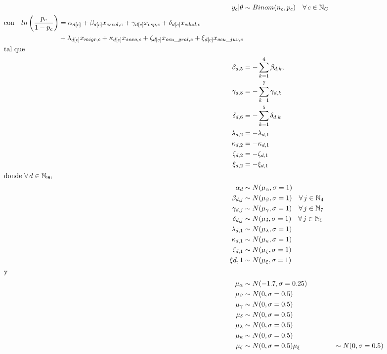 \begin{align}\label{eq:Modelo_Comp_G}
y_c|\theta & \sim Binom(n_c,p_c) \quad \forall \, c \in \mathbb{N}_C \nonumber \\
\begin{split}
\text{con} \quad ln\left(\dfrac{p_c}{1-p_c}\right) &= \alpha_{d[c]} + \beta_{d[c]} x_{escol,c} + \gamma_{d[c]} x_{csp,c} + \delta_{d[c]} x_{edad,c} \\
&+ \lambda_{d[c]} x_{migr,c} + \kappa_{d[c]} x_{sexo,c} + \zeta_{d[c]} x_{ocu\_gral,c} + \xi_{d[c]} x_{ocu\_juv,c} 
\end{split}\\
\intertext{tal que} 
\beta_{d,5} &= -\sum\limits_{k = 1}^{4} \beta_{d,k}, \nonumber \\
\gamma_{d,8} &= -\sum\limits_{k = 1}^{7} \gamma_{d,k} \nonumber \\
\delta_{d,6} &= -\sum\limits_{k = 1}^{5} \delta_{d,k} \nonumber \\
\lambda_{d,2} &= -\lambda_{d,1} \nonumber \\
\kappa_{d,2} &= -\kappa_{d,1} \nonumber \\
\zeta_{d,2} &= -\zeta_{d,1} \nonumber \\
\xi_{d,2} &= -\xi_{d,1} \nonumber \\
\intertext{donde $\forall \, d \in \mathbb{N}_{96}$}
\alpha_d &\sim N(\mu_{\alpha}, \sigma=1) \quad  \nonumber \\
\beta_{d,j} &\sim N(\mu_{\beta}, \sigma=1) \quad \forall \, j \in \mathbb{N}_{4} \nonumber \\
\gamma_{d,j} &\sim N(\mu_{\gamma}, \sigma=1) \quad \forall \, j \in \mathbb{N}_{7} \nonumber \\
\delta_{d,j} &\sim N(\mu_{\delta}, \sigma=1) \quad \forall \, j \in \mathbb{N}_{5}  \nonumber \\ 
\lambda_{d,1} &\sim N(\mu_{\lambda}, \sigma=1) \nonumber \\
\kappa_{d,1} &\sim N(\mu_{\kappa}, \sigma=1) \nonumber \\ 
\zeta_{d,1} &\sim N(\mu_{\zeta}, \sigma=1) \nonumber \\
\xi{d,1} &\sim N(\mu_{\xi}, \sigma=1) \nonumber \\
\intertext{y}
\mu_{\alpha} &\sim N(-1.7,\sigma=0.25) \nonumber \\
\mu_{\beta} &\sim N(0,\sigma=0.5) \nonumber \\
\mu_{\gamma} &\sim N(0,\sigma=0.5) \nonumber \\
\mu_{\delta} &\sim N(0,\sigma=0.5) \nonumber \\
\mu_{\lambda} &\sim N(0,\sigma=0.5) \nonumber \\
\mu_{\kappa} &\sim N(0,\sigma=0.5) \nonumber \\
\mu_{\zeta} &\sim N(0,\sigma=0.5) \nonumber
\mu_{\xi} &\sim N(0,\sigma=0.5) \nonumber
\end{align}


